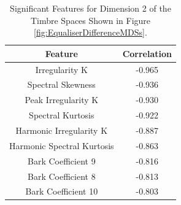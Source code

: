		\begin{table}[h!]
			\centering
			\begin{tabular}{|c|c|}
				\hline
				\bf{Feature} & \bf{Correlation} \\
				\hline
				\hline
				Irregularity K & -0.965 \\
				\hline
				Spectral Skewness & -0.936 \\
				\hline
				Peak Irregularity K & -0.930 \\
				\hline
				Spectral Kurtosis & -0.922 \\
				\hline
				Harmonic Irregularity K & -0.887 \\
				\hline
				Harmonic Spectral Kurtosis & -0.863 \\
				\hline
				Bark Coefficient 9 & -0.816 \\
				\hline
				Bark Coefficient 8 & -0.813 \\
				\hline
				Bark Coefficient 10 & -0.803 \\
				\hline
			\end{tabular}
			\caption{Significant Features for Dimension 2 of the Timbre Spaces Shown in Figure 
				 \ref{fig:EqualiserDifferenceMDSs}.}
			\label{tab:EqualiserDifferenceFeaturesDim2}
		\end{table}

